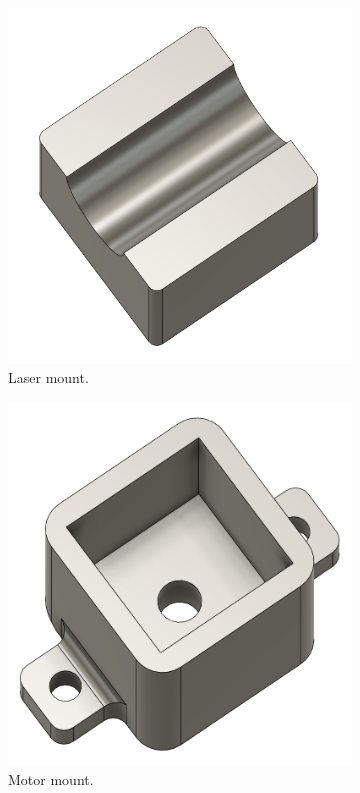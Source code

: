 \begin{figure}[!htb]
  \centering
  \begin{subfigure}{0.3\textwidth}
    \centering
    \includegraphics[width=0.7\linewidth]{figures/hardware_design/laser_mount.png}
    \caption{Laser mount.}
  \end{subfigure}
  \quad
  \begin{subfigure}{0.3\textwidth}
    \centering
    \includegraphics[width=0.7\linewidth]{figures/hardware_design/motor_mount.png}
    \caption{Motor mount.}
  \end{subfigure}
  \quad
  \begin{subfigure}{0.3\textwidth}
    \centering

\end{subfigure}
\end{figure}
